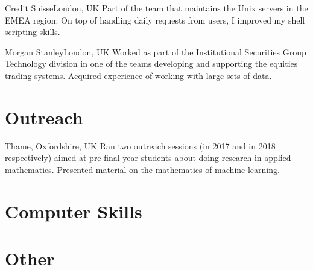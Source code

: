 \documentclass[11pt,a4paper,roman]{moderncv} %
\begin{document}
        {Credit Suisse}{London, UK}{}
        {
          Part of the team that maintains the Unix servers in the 
          EMEA region. On top of handling daily requests from users, 
          I improved my shell scripting skills.
        }

        {Morgan Stanley}{London, UK}{}
        {
          Worked as part of the Institutional Securities Group Technology 
          division in one of the teams developing and supporting the equities 
          trading systems. Acquired experience of working with large sets of data.
        }

\section{Outreach}

        {Thame, Oxfordshire, UK}{}{}
        {
          Ran two outreach sessions (in 2017 and in 2018 respectively) 
          aimed at pre-final year 
          students about doing research in applied mathematics.
          Presented material on the mathematics of machine learning.
        }


\section{Computer Skills}


\section{Other}



%
%
%
%
\end{document}
